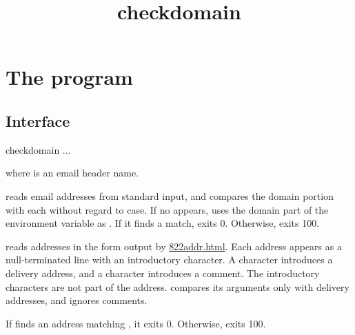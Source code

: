 \documentclass{book}
\title{checkdomain}
\begin{document}
\section{The  program}

\subsection{Interface}
\begin{code}%
  checkdomain  ...
\end{code}
where  is an email header name.

 reads email addresses from standard input,
and compares the domain portion with each 
without regard to case.
If no  appears,  uses the domain
part of the environment variable 
as .  If it finds a match,  exits 0.
Otherwise,  exits 100.

 reads addresses in the form output by 
\href{\cmd{822addr}}{822addr.html}.  Each address appears
as a null-terminated line with an introductory character.
A \cmd{+} character introduces a
delivery address, and a \cmd{(} character introduces a comment.
The introductory characters are not part of the address.
 compares its arguments only with delivery
addresses, and ignores comments.

If  finds an address matching , it exits 0.
Otherwise,  exits 100.
\end{document}
